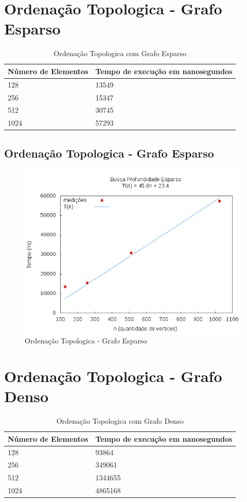 \documentclass[12pt,a4paper,twoside]{report}
\begin{document}
\section{Ordenação Topologica - Grafo Esparso}
\begin{table}[H]
\centering
\caption{Ordenação Topologica com Grafo Esparso}
\label{my-label}
\begin{tabular}{|l|l|}
\hline
\multicolumn{1}{|c|}{\textbf{Número de Elementos}} & \multicolumn{1}{c|}{\textbf{Tempo de execução em nanosegundos}} \\ \hline
128 & 13549 \\ \hline
256 & 15347 \\ \hline
512 & 30745 \\ \hline
1024 & 57293 \\ \hline
\end{tabular}
\end{table}

\subsection{Ordenação Topologica - Grafo Esparso}
\begin{figure}[H]
    \centering
    \includegraphics[width=0.7\linewidth]{graficos/OrdenaTopologico/Esparso/Esparso.png}
  \caption{Ordenação Topologica - Grafo Esparso}
\end{figure}

\section{Ordenação Topologica - Grafo Denso}
\begin{table}[H]
\centering
\caption{Ordenação Topologica com Grafo Denso}
\label{my-label}
\begin{tabular}{|l|l|}
\hline
\multicolumn{1}{|c|}{\textbf{Número de Elementos}} & \multicolumn{1}{c|}{\textbf{Tempo de execução em nanosegundos}} \\ \hline
128 & 93864 \\ \hline
256 & 349061 \\ \hline
512 & 1344655 \\ \hline
1024 & 4865168 \\ \hline
\end{tabular}
\end{table}
\end{document}

